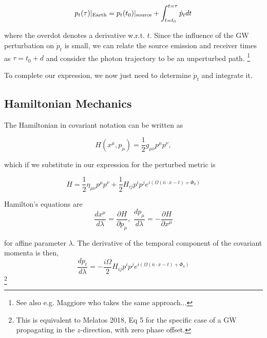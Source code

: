\documentclass{tufte-handout} %
\begin{document}
\begin{equation}
	p_t(\tau)|_{\rm Earth} = p_t(t_0)|_{\rm source} + \int_{t = t_0}^{t=\tau} \dot{p}_t dt
	\end{equation}

\noindent where the overdot denotes a derivative w.r.t. $t$. Since the influence of the GW perturbation on $\dot{p}_t$ is small, we can relate the source emission and receiver times as $\tau = t_0 + d$ and consider the photon trajectory to be an unperturbed path. \footnote{See also e.g. Maggiore who takes the same approach...} \newline 


\noindent To complete our expression, we now just need to determine $\dot{p}_t$ and integrate it.


\subsection{Hamiltonian Mechanics}

The Hamiltonian in covariant notation can be written as 

\begin{equation}
H(x^{\mu}, p_{\mu}) = \frac{1}{2} g_{\mu \nu} p^{\mu} p^{\nu},
\end{equation}

\noindent which if we substitute in our expression for the perturbed metric is

\begin{equation}
H = \frac{1}{2} \eta_{\mu \nu} p^{\mu} p^{\nu} + \frac{1}{2} H_{ij}p^i p^j e^{i(\Omega(\bar{n} \cdot \bar{x} - t) + \Phi_0)	}
\end{equation}

\noindent Hamilton's equations are
\begin{equation}
\frac{dx^{\mu}}{d\lambda} = \frac{\partial H}{\partial p_{\mu}} , \, \, \frac{dp_{\mu}}{d \lambda} = -\frac{\partial H}{\partial x^{\mu}} 
\end{equation}

\noindent for affine parameter $\lambda$. The derivative of the temporal component of the covariant momenta is then,
\begin{equation}
\frac{d p_{t}}{d \lambda} = -\frac{i\Omega}{2} H_{ij}p^i p^j  e^{i(\Omega(\bar{n}\cdot \bar{x} - t)+\Phi_0)}
\end{equation}
\footnote{This is equivalent to Melatos 2018, Eq 5 for the specific case of a GW propagating in the $z$-direction, with zero phase offset.}
\end{document}
